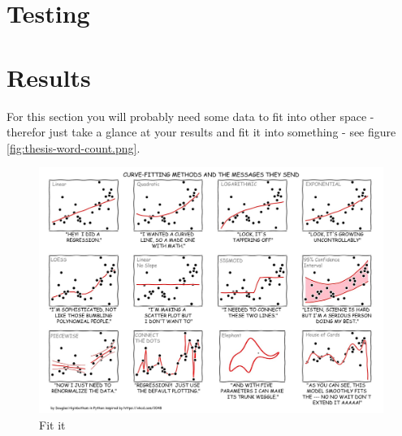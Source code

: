 \par

\section{Testing}

\par

\section{Results}

\par For this section you will probably need some data to fit into other space - therefor just take a glance at your results and fit it into something - see figure \ref{fig:thesis-word-count.png}. 

\begin{figure}[H]
    \centering
    \includegraphics[scale=0.35]{Figures/xkcd-python.png}
    \caption[Data fit]{Fit it}
    \label{fig:xkcd-python.png}
\end{figure}


